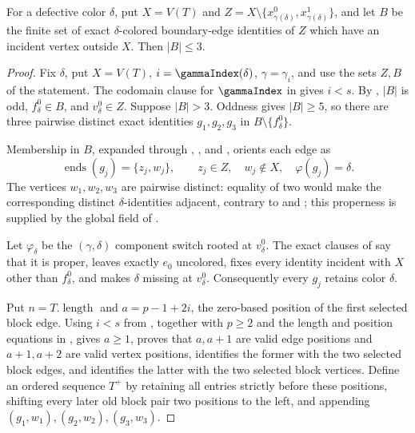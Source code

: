 \begin{helper}
For a defective color $\delta$, put
$X=V(T)$ and
$Z=X\setminus\{x^0_{\gamma(\delta)},x^1_{\gamma(\delta)}\}$, and let
$B$ be the finite set of exact $\delta$-colored boundary-edge identities
of $Z$ which have an incident vertex outside $X$.  Then $|B|\le3$.
\end{helper}
\begin{proof}
Fix $\delta$, put $X=V(T)$, $i=\gammaIndex(\delta)$,
$\gamma=\gamma_i$, and use the sets $Z,B$ of the statement.  The
codomain clause for $\gammaIndex$ in 
gives $i<s$.  By
, $|B|$ is odd,
$f^0_\delta\in B$, and $v^0_\delta\in Z$.  Suppose $|B|>3$.  Oddness
gives $|B|\ge5$, so there are three pairwise distinct exact identities
$g_1,g_2,g_3$ in $B\setminus\{f^0_\delta\}$.

Membership in $B$, expanded through ,
, and , orients each edge
as
\[
 \operatorname{ends}(g_j)=\{z_j,w_j\},\qquad
 z_j\in Z,\quad w_j\notin X,\quad\varphi(g_j)=\delta.
\]
The vertices $w_1,w_2,w_3$ are pairwise distinct: equality of two would
make the corresponding distinct $\delta$-identities adjacent, contrary
to  and ; this
properness is supplied by the global field of
.

Let $\varphi_\delta$ be the $(\gamma,\delta)$ component switch rooted at
$v^0_\delta$.  The exact clauses of
 say that it is proper, leaves
exactly $e_0$ uncolored, fixes every identity incident with $X$ other
than $f^0_\delta$, and makes $\delta$ missing at $v^0_\delta$.
Consequently every $g_j$ retains color $\delta$.

Put $n=T.\operatorname{length}$ and
$a=p-1+2i$, the zero-based position of the first selected block edge.
Using $i<s$ from , together with $p\ge2$
and the length and position equations in
, gives $a\ge1$, proves that
$a,a+1$ are valid edge positions and $a+1,a+2$ are valid vertex
positions, identifies the former with the two selected block edges, and
identifies the latter with the two selected block vertices.  Define an
ordered sequence $T^+$ by retaining all entries strictly before these
positions, shifting every later old block pair two positions to the
left, and appending
$(g_1,w_1),(g_2,w_2),(g_3,w_3)$.


\end{proof}
